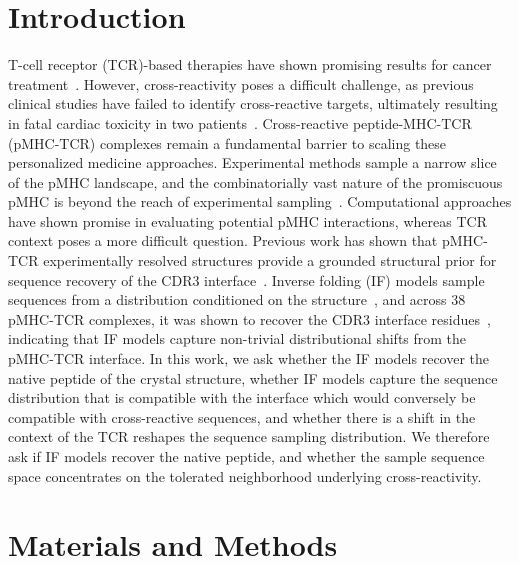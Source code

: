 \documentclass{article}
\begin{document}
\section{Introduction}
T-cell receptor (TCR)-based therapies have shown promising results for cancer treatment~\citep{hong2023mage,fda2024tecelra}. However, cross-reactivity poses a difficult challenge, as previous clinical studies have failed to identify cross-reactive targets, ultimately resulting in fatal cardiac toxicity in two patients~\citep{linette2013cardiovascular,cameron2013titin}. Cross-reactive peptide-MHC-TCR (pMHC-TCR) complexes remain a fundamental barrier to scaling these personalized medicine approaches. Experimental methods sample a narrow slice of the pMHC landscape, and the combinatorially vast nature of the promiscuous pMHC is beyond the reach of experimental sampling~\citep{mason1998crossreactivity,wooldridge2012million}. Computational approaches have shown promise in evaluating potential pMHC interactions, whereas TCR context poses a more difficult question. Previous work has shown that pMHC-TCR experimentally resolved structures provide a grounded structural prior for sequence recovery of the CDR3 interface~\citep{ribeirofilho2024exploring}. Inverse folding (IF) models sample sequences from a distribution conditioned on the structure~\citep{dauparas2022proteinmpnn,hsu2022esmif}, and across 38 pMHC-TCR complexes, it was shown to recover the CDR3 interface residues~\citep{ribeirofilho2024exploring}, indicating that IF models capture non-trivial distributional shifts from the pMHC-TCR interface. In this work, we ask whether the IF models recover the native peptide of the crystal structure, whether IF models capture the sequence distribution that is compatible with the interface which would conversely be compatible with cross-reactive sequences, and whether there is a shift in the context of the TCR reshapes the sequence sampling distribution. We therefore ask if IF models recover the native peptide, and whether the sample sequence space concentrates on the tolerated neighborhood underlying cross-reactivity.

\section{Materials and Methods}
\end{document}
